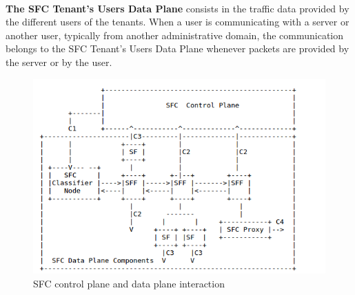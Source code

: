 \\
\textbf{The SFC Tenant’s Users Data Plane} consists in the traffic data provided by the different users of the tenants. When a user is communicating with a server or another user, typically from another administrative domain, the communication belongs to
the SFC Tenant’s Users Data Plane whenever packets are provided by the server or by the user.
\begin{figure}[htp]
    \includegraphics[scale=0.72]{sfpc}
    \hspace*{-2cm}
    \caption{SFC control plane and data plane interaction }
\end{figure} 
\newpage
